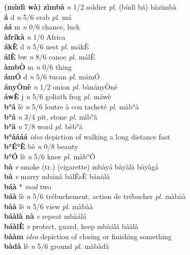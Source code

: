 \documentclass{article}
\newlength\cus
\begin{document}
 


\setlength{}

\noindent
{\bf (mùdì wà) zìmbà}  {\it n} 1/2 soldier {\it pl.} (bùdì bá) bàzìmbà         \\ 
{\bf á} d {\it n} 5/6 crab {\it pl.} má         \\ 
{\bf áá} m {\it n} 0/6 chance, luck         \\ 
{\bf àfríkà}  {\it n} 1/0 Africa         \\ 
{\bf ákÈ} d {\it n} 5/6 nest {\it pl.} mákÈ         \\ 
{\bf álÈ } bw {\it n} 8/6 canoe {\it pl.} málÈ         \\ 
{\bf àmbÒ} m {\it n} 0/6 thing         \\ 
{\bf ámÓ} d {\it n} 5/6 tucan {\it pl.} mámÓ         \\ 
{\bf ányÒnè}  {\it n} 1/2  onion {\it pl.} bànányÒnè         \\ 
{\bf áwÈ} j {\it n} 5/6 goliath frog {\it pl.} máwè         \\ 
{\bf b°â} lè {\it n} 5/6 loutre à cou tacheté {\it pl.} màb°â         \\ 
{\bf b°â}  {\it n} 3/4 pit, stone {\it pl.} mìb°â         \\ 
{\bf b°ä}  {\it n} 7/8 word {\it pl.} bèb°ä         \\ 
{\bf b°áááá}  {\it ideo} depiction of walking a long distance fast         \\ 
{\bf b°É°È} bè {\it n} 0/8 beauty         \\ 
{\bf b°Ó} lè {\it n} 5/6 knee {\it pl.} màb°Ô         \\ 
{\bf bà}  {\it v} smoke (tr.) (cigarette)   mbàyá   bàyàlà bàyàgà  \\ 
{\bf bâ}  {\it v} marry   mbánâ  bálÈsÈ bánàlà   \\ 
{\bf báà} * {\it mod} two         \\ 
{\bf báà} lè {\it n} 5/6 trébuchement, action de trébucher {\it pl.} màbáà         \\ 
{\bf bàà} lè {\it n} 5/6 view {\it pl.} màbàà         \\ 
{\bf báàlà nà}  {\it v} repeat   mbàálâ      \\ 
{\bf báàlÈ}  {\it v} protect, guard, keep   mbàálá   báàlà   \\ 
{\bf bààm}  {\it ideo} depiction of closing or finishing something         \\ 
{\bf bàdà} lè {\it n} 5/6 ground {\it pl.} màbàdà         \\ 
\end{document}
